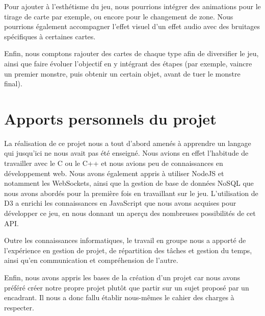 \documentclass[12pt]{report}
\begin{document}
  Pour ajouter à l'esthétisme du jeu, nous pourrions intégrer des animations pour le tirage de carte par exemple, ou encore pour le changement de zone. Nous pourrions également accompagner l'effet visuel d'un effet audio avec des bruitages spécifiques à certaines cartes.

  Enfin, nous comptons rajouter des cartes de chaque type afin de diversifier le jeu, ainsi que faire évoluer l'objectif en y intégrant des étapes (par exemple, vaincre un premier monstre, puis obtenir un certain objet, avant de tuer le monstre final).

  \section*{Apports personnels du projet}
  La réalisation de ce projet nous a tout d'abord amenés à apprendre un langage qui jusqu'ici ne nous avait pas été enseigné. Nous avions en effet l'habitude de travailler avec le C ou le C++ et nous avions peu de connaissances en développement web. Nous avons également appris à utiliser NodeJS et notamment les WebSockets, ainsi que la gestion de base de données NoSQL que nous avons abordés pour la première fois en travaillant sur le jeu. L'utilisation de D3 a enrichi les connaissances en JavaScript que nous avons acquises pour développer ce jeu, en nous donnant un aperçu des nombreuses possibilités de cet API.

  Outre les connaissances informatiques, le travail en groupe nous a apporté de l'expérience en gestion de projet, de répartition des tâches et gestion du temps, ainsi qu'en communication et compréhension de l'autre.

  Enfin, nous avons appris les bases de la création d'un projet car nous avons préféré créer notre propre projet plutôt que partir sur un sujet proposé par un encadrant. Il nous a donc fallu établir nous-mêmes le cahier des charges à respecter.
\end{document}
